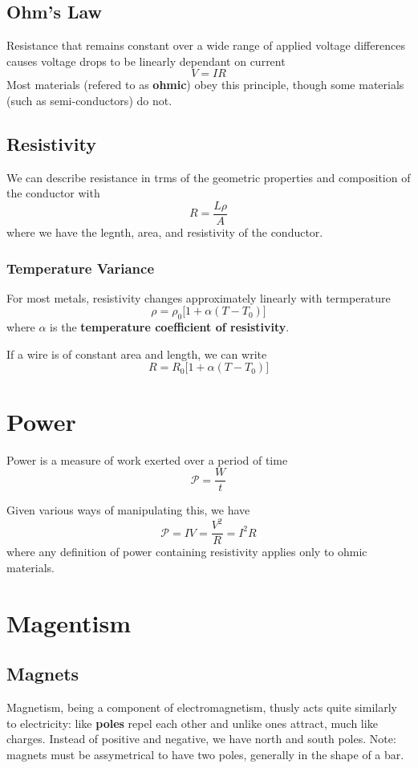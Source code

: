 \documentclass[12pt]{article}
\begin{document}
\subsection*{Ohm's Law}
Resistance that remains constant over a wide range of applied voltage differences causes voltage drops to be linearly dependant on current \[ V = IR \] Most materials (refered to as {\bf ohmic}) obey this principle, though some materials (such as semi-conductors) do not.

\subsection*{Resistivity}
We can describe resistance in trms of the geometric properties and composition of the conductor with \[ R = \frac{L \rho}{A} \] where we have the legnth, area, and resistivity of the conductor.

\subsubsection*{Temperature Variance}
For most metals, resistivity changes approximately linearly with termperature \[ \rho = \rho_0 \bigl[ 1 + \alpha(T - T_0) \bigl] \] where $\alpha$ is the {\bf temperature coefficient of resistivity}.

If a wire is of constant area and length, we can write \[ R = R_0 \bigl[ 1 + \alpha (T - T_0) \bigl] \]

\section*{Power}
Power is a measure of work exerted over a period of time \[ \mathcal{P} = \frac{W}{t} \]

Given various ways of manipulating this, we have \[ \mathcal{P} = IV = \frac{V^2}{R} = I^2R \] where any definition of power containing resistivity applies only to ohmic materials.

\section*{Magentism}
\subsection*{Magnets}
Magnetism, being a component of electromagnetism, thusly acts quite similarly to electricity: like {\bf poles} repel each other and unlike ones attract, much like charges. Instead of positive and negative, we have north and south poles. Note: magnets must be assymetrical to have two poles, generally in the shape of a bar.
\end{document}
